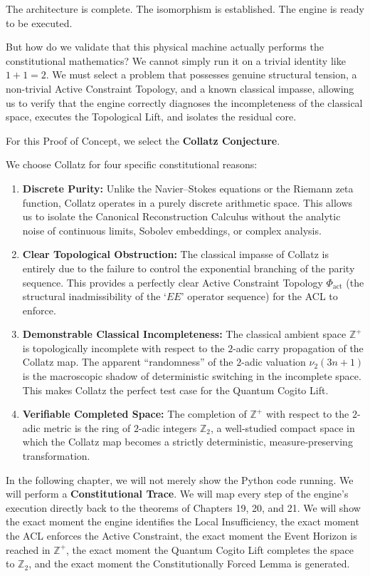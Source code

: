 \documentclass[12pt,openany]{extbook}
\theoremstyle{plain}
\theoremstyle{definition}
\begin{document}
The architecture is complete. The isomorphism is established. The engine is ready to be executed.

But how do we validate that this physical machine actually performs the constitutional mathematics? We cannot simply run it on a trivial identity like $1+1=2$. We must select a problem that possesses genuine structural tension, a non-trivial Active Constraint Topology, and a known classical impasse, allowing us to verify that the engine correctly diagnoses the incompleteness of the classical space, executes the Topological Lift, and isolates the residual core.

For this Proof of Concept, we select the \textbf{Collatz Conjecture}.

We choose Collatz for four specific constitutional reasons:
\begin{enumerate}
    \item \textbf{Discrete Purity:} Unlike the Navier--Stokes equations or the Riemann zeta function, Collatz operates in a purely discrete arithmetic space. This allows us to isolate the Canonical Reconstruction Calculus without the analytic noise of continuous limits, Sobolev embeddings, or complex analysis.
    \item \textbf{Clear Topological Obstruction:} The classical impasse of Collatz is entirely due to the failure to control the exponential branching of the parity sequence. This provides a perfectly clear Active Constraint Topology $\Phi_{\mathrm{act}}$ (the structural inadmissibility of the `$EE$' operator sequence) for the ACL to enforce.
    \item \textbf{Demonstrable Classical Incompleteness:} The classical ambient space $\mathbb{Z}^+$ is topologically incomplete with respect to the $2$-adic carry propagation of the Collatz map. The apparent ``randomness'' of the $2$-adic valuation $\nu_2(3n+1)$ is the macroscopic shadow of deterministic switching in the incomplete space. This makes Collatz the perfect test case for the Quantum Cogito Lift.
    \item \textbf{Verifiable Completed Space:} The completion of $\mathbb{Z}^+$ with respect to the $2$-adic metric is the ring of $2$-adic integers $\mathbb{Z}_2$, a well-studied compact space in which the Collatz map becomes a strictly deterministic, measure-preserving transformation.
\end{enumerate}

In the following chapter, we will not merely show the Python code running. We will perform a \textbf{Constitutional Trace}. We will map every step of the engine's execution directly back to the theorems of Chapters 19, 20, and 21. We will show the exact moment the engine identifies the Local Insufficiency, the exact moment the ACL enforces the Active Constraint, the exact moment the Event Horizon is reached in $\mathbb{Z}^+$, the exact moment the Quantum Cogito Lift completes the space to $\mathbb{Z}_2$, and the exact moment the Constitutionally Forced Lemma is generated.
\end{document}

